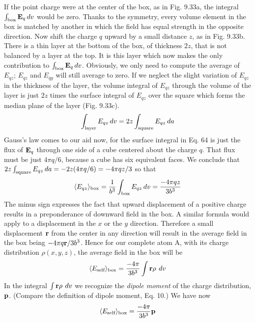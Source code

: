 If the point charge were at the center of the box, as in Fig. 9.33a,
the integral $\int_\text{box} \mathbf{E}_q\mathop{d\!} v$ would be zero. Thanks to the symmetry,
every volume element in the box is matched by another in which the
field has equal strength in the opposite direction. Now shift the
charge $q$ upward by a small distance $z$, as in Fig. 9.33b. There is a
thin layer at the bottom of the box, of thickness $2z$, that is not balanced
by a layer at the top. It is this layer which now makes the only
contribution to $\int_\text{box} \mathbf{E}_q\mathop{d\!} v$. Obviously, we only need to compute the
average of $E_{qz}$; $E_{qz}$ and $E_{qy}$ will still average to zero. If we neglect the
slight variation of $E_{qz}$ in the thickness of the layer, the volume integral
of $E_{qz}$ through the volume of the layer is just $2z$ times the 
surface integral of $E_{qz}$ over the square which forms the median plane
of the layer (Fig. 9.33c).
\begin{equation}
  \int_\text{layer} E_{qz}\mathop{d\!} v = 2z \int_\text{square} E_{qz}\mathop{d\!} a
\end{equation}
Gauss's law comes to our aid now, for the surface integral in Eq. 64
is just the flux of $\mathbf{E}_q$ through one side of a cube centered about the
charge $q$. That flux must be just $4\pi q/6$, because a cube has six 
equivalent faces. We conclude that $2z \int_\text{square} E_{qz}\mathop{d\!} a=-2z(4\pi q/6)
=-4\pi qz/3$ so that
\begin{equation}
  \langle E_{qz}\rangle_\text{box} = \frac{1}{b^3} \int_\text{box} E_{qz}\mathop{d\!} v = \frac{-4\pi qz}{3 b^3}
\end{equation}
The minus sign expresses the fact that upward displacement of a
positive charge results in a preponderance of downward field in the
box. A similar formula would apply to a displacement in the $x$ or
the $y$ direction. Therefore a small displacement $\mathbf{r}$ from the center in
any direction will result in the average field in the box being
$-4\pi q\mathbf{r}/3b^3$. Hence for our complete atom A, with its charge distribution
$\rho(x,y,z)$, the average field in the box will be
\begin{equation}
  \langle E_\text{self}\rangle_\text{box} = \frac{-4\pi}{3b^3} \int\mathbf{r}\rho\:\mathop{d\!} v
\end{equation}
In the integral $\int\mathbf{r}\rho\:\mathop{d\!} v$ we recognize the \emph{dipole moment} of the
charge distribution, $\mathbf{p}$. (Compare the definition of dipole moment,
Eq. 10.) We have now
\begin{equation}
  \langle E_\text{self}\rangle_\text{box} = \frac{-4\pi}{3b^3}\mathbf{p}
\end{equation}


